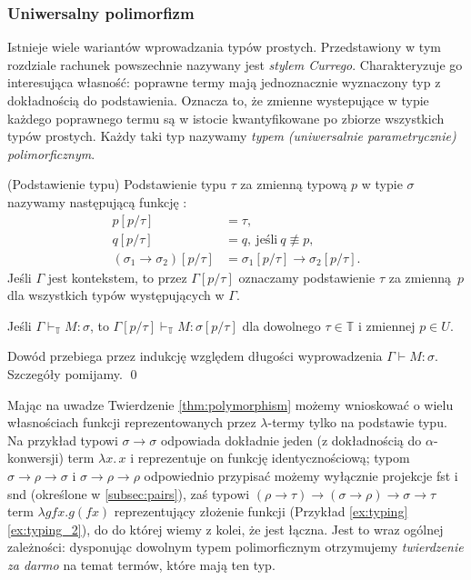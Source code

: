 \subsubsection{Uniwersalny polimorfizm}
Istnieje wiele wariantów wprowadzania typów prostych. Przedstawiony w tym rozdziale rachunek powszechnie nazywany jest \emph{stylem Currego}. Charakteryzuje go interesująca własność: poprawne termy mają jednoznacznie wyznaczony typ z dokładnością do podstawienia. Oznacza to, że zmienne wystepujące w typie każdego poprawnego termu są w istocie kwantyfikowane po zbiorze wszystkich typów prostych. Każdy taki typ nazywamy \emph{typem (uniwersalnie parametrycznie) polimorficznym}.

\begin{definicja}(Podstawienie typu)
Podstawienie typu \(\tau\) za zmienną typową \(p\) w typie \(\sigma\) nazywamy następującą funkcję :
\begin{align*}
  p[p/ \tau] &=\tau,\\
  q[p/ \tau] &=q,\ \text{jeśli}\ q\not\equiv p,\\
  (\sigma_1 \to \sigma_2) [p/\tau] &= \sigma_1 [p/\tau] \to \sigma_2 [p/\tau].
\end{align*}
  Jeśli \(\Gamma\) jest kontekstem, to przez \(\Gamma[p/\tau]\) oznaczamy podstawienie \(\tau\) za zmienną \(p\) dla wszystkich typów występujących w \(\Gamma\).
\end{definicja}

\begin{twierdzenie}\label{thm:polymorphism}
  Jeśli \(\Gamma\vdash_\mathbb{T} M:\sigma\), to \(\Gamma [p/\tau]\vdash_\mathbb{T} M:\sigma[p/\tau]\) dla dowolnego \(\tau\in\mathbb{T}\) i zmiennej \(p\in U\).
\end{twierdzenie}
\begin{dowod}
  Dowód przebiega przez indukcję względem długości wyprowadzenia \(\Gamma\vdash M:\sigma\). Szczegóły pomijamy. \qed
\end{dowod}

Mając na uwadze Twierdzenie \ref{thm:polymorphism} możemy wnioskować o wielu własnościach funkcji reprezentowanych przez \(\lambda\)-termy tylko na podstawie typu. Na przykład typowi \(\sigma\to\sigma\) odpowiada dokładnie jeden (z dokładnością do \(\alpha\)-konwersji) term \(\lambda x.\,x\) i reprezentuje on funkcję identycznościową; typom \(\sigma\to\rho\to\sigma\) i \(\sigma\to\rho\to\rho\) odpowiednio przypisać możemy wyłącznie projekcje fst i snd (określone w \ref{subsec:pairs}), zaś typowi \((\rho\to\tau) \to (\sigma\to\rho)\to\sigma\to\tau\) term \(\lambda g f x. g (f x)\) reprezentujący złożenie funkcji (Przykład \ref{ex:typing} \ref{ex:typing_2}), do do której wiemy z kolei, że jest łączna.
Jest to wraz ogólnej zależności: dysponując dowolnym typem polimorficznym otrzymujemy \emph{twierdzenie za darmo} \cite{Wadler1989} na temat termów, które mają ten typ. 


